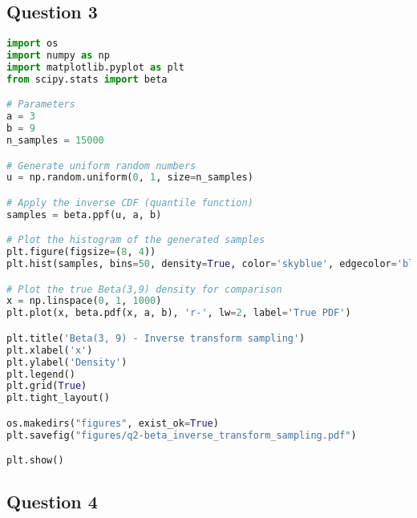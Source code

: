 \newpage
\subsection{Question 3}

\begin{lstlisting}[language=Python]
import os
import numpy as np
import matplotlib.pyplot as plt
from scipy.stats import beta

# Parameters
a = 3
b = 9
n_samples = 15000

# Generate uniform random numbers
u = np.random.uniform(0, 1, size=n_samples)

# Apply the inverse CDF (quantile function)
samples = beta.ppf(u, a, b)

# Plot the histogram of the generated samples
plt.figure(figsize=(8, 4))
plt.hist(samples, bins=50, density=True, color='skyblue', edgecolor='black', alpha=0.7, label='Simulated (Inverse transform)')

# Plot the true Beta(3,9) density for comparison
x = np.linspace(0, 1, 1000)
plt.plot(x, beta.pdf(x, a, b), 'r-', lw=2, label='True PDF')

plt.title('Beta(3, 9) - Inverse transform sampling')
plt.xlabel('x')
plt.ylabel('Density')
plt.legend()
plt.grid(True)
plt.tight_layout()

os.makedirs("figures", exist_ok=True)
plt.savefig("figures/q2-beta_inverse_transform_sampling.pdf")

plt.show()
\end{lstlisting}


\newpage
\subsection{Question 4}

